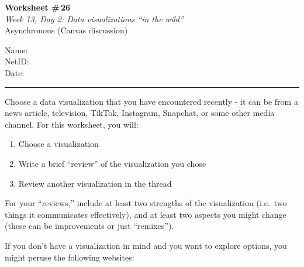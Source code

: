 \documentclass[11pt]{article}
\begin{document}
\RaggedRight

\noindent
\begin{minipage}[t]{0.55\textwidth}
  \vspace{0pt}
  {\LARGE \textbf{Worksheet \#\,26}} \\[0.18em]
  {\large \textit{Week 13, Day 2: Data visualizations ``in the wild''}} \\[0.18em]
  {\small Asynchronous (Canvas discussion)}
\end{minipage}
\hfill
\begin{minipage}[t]{0.40\textwidth}
  \vspace{0pt}
  \small
  Name: \underline{\hspace{4.5cm}} \\[0.35em]
  NetID: \underline{\hspace{4.3cm}} \\[0.35em]
  Date: \underline{\hspace{4.4cm}} \\
\end{minipage}

\vspace{0.5em}
\noindent\rule{\linewidth}{0.6pt}
\vspace{0.3em}

Choose a data visualization that you have encountered recently - it can be from a news article, television, TikTok, Instagram, Snapchat, or some other media channel. For this worksheet, you will:

\begin{enumerate}[itemsep=0.1em, topsep=0.3em]
  \item Choose a visualization
  \item Write a brief ``review'' of the visualization you chose
  \item Review another visualization in the thread
\end{enumerate}

\vspace{0.3em}
For your ``reviews,'' include at least two strengths of the visualization (i.e.\ two things it communicates effectively), and at least two aspects you might change (these can be improvements or just ``remixes'').

\vspace{0.3em}
If you don't have a visualization in mind and you want to explore options, you might peruse the following websites:
\end{document}

